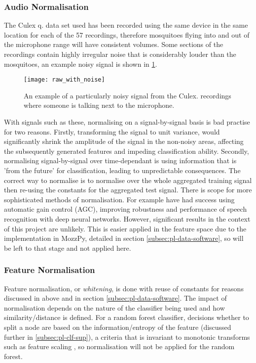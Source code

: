         \subsubsection{Audio Normalisation}
        \label{subsubsec:exp-clf-audio}
            The Culex q. data set used has been recorded using the same device in the same location for each of the 57 recordings, therefore mosquitoes flying into and out of the microphone range will have consistent volumes. Some sections of the recordings contain highly irregular noise that is considerably louder than the mosquitoes, an example noisy signal is shown in \ref{fig:exp-clf-audio-noisy}.
            \begin{figure}[ht]
                \centering
                \texttt{[image: raw\_with\_noise]}
                \caption{An example of a particularly noisy signal from the Culex. recordings where someone is talking next to the microphone.}
                \label{fig:exp-clf-audio-noisy}
            \end{figure}
            With signals such as these, normalising on a signal-by-signal basis is bad practise for two reasons. Firstly, transforming the signal to unit variance, would significantly shrink the amplitude of the signal in the non-noisy areas, affecting the subsequently generated features and impeding classification ability. Secondly, normalising signal-by-signal over time-dependant is using information that is 'from the future' for classification, leading to unpredictable consequences. The correct way to normalise is to normalise over the whole aggregated training signal then re-using the constants for the aggregated test signal. There is scope for more sophisticated methods of normalisation. For example \textcite{Prabhavalkar2015} have had success using automatic gain control (AGC), improving robustness and performance of speech recognition with deep neural networks. However, significant results in the context of this project are unlikely. This is easier applied in the feature space due to the implementation in MozzPy, detailed in section \ref{subsec:pl-data-software}, so will be left to that stage and not applied here.
            
        \subsubsection{Feature Normalisation}
        \label{subsubsec:exp-clf-featnorm}
            Feature normalisation, or \textit{whitening}, is done with reuse of constants for reasons discussed in above and in section \ref{subsec:pl-data-software}. The impact of normalisation depends on the nature of the classifier being used and how similarity/distance is defined. For a random forest classifier, decisions whether to split a node are based on the information/entropy of the feature (discussed further in \ref{subsec:pl-clf-sup}), a criteria that is invariant to monotonic transforms such as feature scaling \cite{Hastie2009}, so normalisation will not be applied for the random forest.
            
